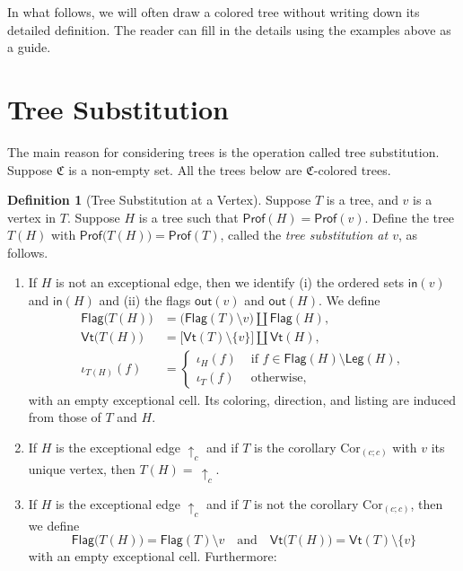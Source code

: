 \documentclass{amsbook}
\numberwithin{section}{chapter}
\numberwithin{subsection}{section}
\numberwithin{equation}{section}
\theoremstyle{plain}
\theoremstyle{definition}
\newtheorem{definition}[equation]{Definition}
\newcommand{\colorc}{\mathfrak{C}}
\newcommand{\Cor}{\mathrm{Cor}}
\newcommand{\Flag}{\mathsf{Flag}}
\newcommand{\Leg}{\mathsf{Leg}}
\newcommand{\Prof}{\mathsf{Prof}}
\newcommand{\profofh}{\Prof(H)}
\newcommand{\profoft}{\Prof(T)}
\newcommand{\profofv}{\Prof(v)}
\newcommand{\Vt}{\mathsf{Vt}}
\newcommand{\inp}{\mathsf{in}}
\newcommand{\out}{\mathsf{out}}
\newcommand{\andspace}{\quad\text{and}\quad}
\begin{document}
In what follows, we will often draw a colored tree without writing down its detailed definition.  The reader can fill in the details using the examples above as a guide.

\section{Tree Substitution}\label{sec:tree-sub}

The main reason for considering trees is the operation called tree substitution.  Suppose $\colorc$ is a non-empty set.  All the trees below are $\colorc$-colored trees.

\begin{definition}[Tree Substitution at a Vertex]\label{def:tree-sub-vertex}
Suppose $T$ is a tree, and $v$ is a vertex in $T$.  Suppose $H$ is a tree such that $\profofh = \profofv$.  Define the tree $T(H)$ with $\Prof\bigl(T(H)\bigr) = \profoft$, called the \emph{tree substitution at $v$}, as follows.
\begin{enumerate}
\item If $H$ is not an exceptional edge, then we identify (i) the ordered sets $\inp(v)$ and $\inp(H)$ and (ii) the flags $\out(v)$ and $\out(H)$.  We define 
\[\begin{split}\Flag\bigl(T(H)\bigr) &= \bigl(\Flag(T) \setminus v\bigr) \coprod \Flag(H),\\
\Vt\bigl(T(H)\bigr) &= \bigl[\Vt(T) \setminus \{v\}\bigr] \coprod \Vt(H),\\
\iota_{T(H)}(f) &= \begin{cases} \iota_H(f) & \text{ if $f \in \Flag(H) \setminus \Leg(H)$},\\ \iota_T(f) & \text{ otherwise},\end{cases}
\end{split}\] with an empty exceptional cell.  Its coloring, direction, and listing are induced from those of $T$ and $H$.
\item If $H$ is the exceptional edge $\uparrow_c$ and if $T$ is the corollary $\Cor_{(c;c)}$ with $v$ its unique vertex, then $T(H) =\, \uparrow_c$.
\item If $H$ is the exceptional edge $\uparrow_c$ and if $T$ is not the corollary $\Cor_{(c;c)}$, then we define \[\Flag\bigl(T(H)\bigr)=\Flag(T) \setminus v \andspace 
\Vt\bigl(T(H)\bigr)=\Vt(T) \setminus \{v\}\] with an empty exceptional cell.  Furthermore: 
\begin{enumerate}

\end{enumerate}
\end{enumerate}
\end{definition}
\end{document}
